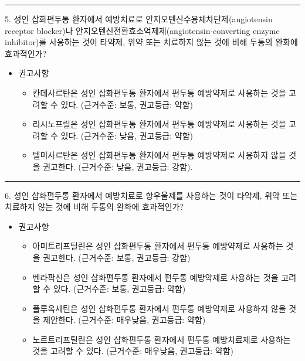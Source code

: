 \documentclass[]{book}
\providecommand{\tightlist}{%
  \setlength{\itemsep}{0pt}\setlength{\parskip}{0pt}}
\begin{document}
\begin{center}\rule{0.5\linewidth}{\linethickness}\end{center}

5. 성인 삽화편두통 환자에서 예방치료로 안지오텐신수용체차단제(angiotensin receptor blocker)나 안지오텐신전환효소억제제(angiotensin-converting enzyme inhibitor)를 사용하는 것이 타약제, 위약 또는 치료하지 않는 것에 비해 두통의 완화에 효과적인가?

\begin{itemize}
\item
  권고사항

  \begin{itemize}
  \tightlist
  \item
    칸데사르탄은 성인 삽화편두통 환자에서 편두통 예방약제로 사용하는 것을 고려할 수 있다. (근거수준: 보통, 권고등급: 약함)
  \item
    리시노프릴은 성인 삽화편두통 환자에서 편두통 예방약제로 사용하는 것을 고려할 수 있다. (근거수준: 낮음, 권고등급: 약함)
  \item
    텔미사르탄은 성인 삽화편두통 환자에서 편두통 예방약제로 사용하지 않을 것을 권고한다. (근거수준: 낮음, 권고등급: 강함).
  \end{itemize}
\end{itemize}

\begin{center}\rule{0.5\linewidth}{\linethickness}\end{center}

6. 성인 삽화편두통 환자에서 예방치료로 항우울제를 사용하는 것이 타약제, 위약 또는 치료하지 않는 것에 비해 두통의 완화에 효과적인가?

\begin{itemize}
\item
  권고사항

  \begin{itemize}
  \tightlist
  \item
    아미트리프틸린은 성인 삽화편두통 환자에서 편두통 예방약제로 사용하는 것을 권고한다. (근거수준: 보통, 권고등급: 강함)
  \item
    벤라팍신은 성인 삽화편두통 환자에서 편두통 예방약제로 사용하는 것을 고려할 수 있다. (근거수준: 보통, 권고등급: 약함)
  \item
    플루옥세틴은 성인 삽화편두통 환자에서 편두통 예방약제로 사용하지 않을 것을 제안한다. (근거수준: 매우낮음, 권고등급: 약함)
  \item
    노르트리프틸린은 성인 삽화편두통 환자에서 편두통 예방치료제로 사용하는 것을 고려할 수 있다. (근거수준: 매우낮음, 권고등급: 약함)
  \end{itemize}
\end{itemize}
\end{document}
